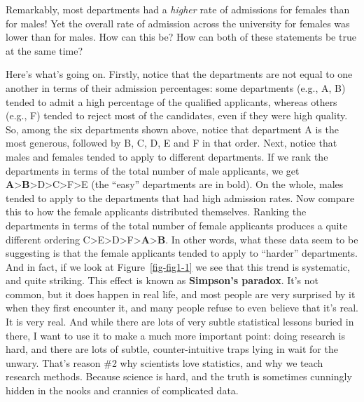 \documentclass[
  a4paper,
]{book}
\begin{document}
Remarkably, most departments had a \emph{higher} rate of admissions for
females than for males! Yet the overall rate of admission across the
university for females was lower than for males. How can this be? How
can both of these statements be true at the same time?

Here's what's going on. Firstly, notice that the departments are not
equal to one another in terms of their admission percentages: some
departments (e.g., A, B) tended to admit a high percentage of the
qualified applicants, whereas others (e.g., F) tended to reject most of
the candidates, even if they were high quality. So, among the six
departments shown above, notice that department A is the most generous,
followed by B, C, D, E and F in that order. Next, notice that males and
females tended to apply to different departments. If we rank the
departments in terms of the total number of male applicants, we get
\textbf{A}\textgreater{}\textbf{B}\textgreater D\textgreater C\textgreater F\textgreater E
(the ``easy'' departments are in bold). On the whole, males tended to
apply to the departments that had high admission rates. Now compare this
to how the female applicants distributed themselves. Ranking the
departments in terms of the total number of female applicants produces a
quite different ordering
C\textgreater E\textgreater D\textgreater F\textgreater{}\textbf{A}\textgreater{}\textbf{B}.
In other words, what these data seem to be suggesting is that the female
applicants tended to apply to ``harder'' departments. And in fact, if we
look at Figure~\ref{fig-fig1-1} we see that this trend is systematic,
and quite striking. This effect is known as \textbf{Simpson's paradox}.
It's not common, but it does happen in real life, and most people are
very surprised by it when they first encounter it, and many people
refuse to even believe that it's real. It is very real. And while there
are lots of very subtle statistical lessons buried in there, I want to
use it to make a much more important point: doing research is hard, and
there are lots of subtle, counter-intuitive traps lying in wait for the
unwary. That's reason \#2 why scientists love statistics, and why we
teach research methods. Because science is hard, and the truth is
sometimes cunningly hidden in the nooks and crannies of complicated
data.
\end{document}
